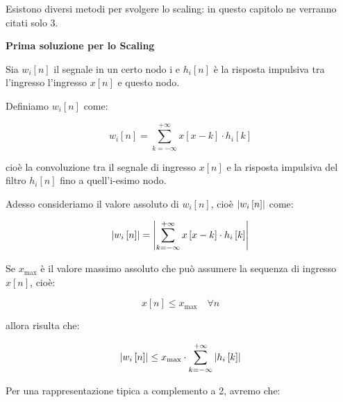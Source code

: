 Esistono diversi metodi per svolgere lo scaling: in questo capitolo ne verranno citati solo 3. \newline 

\textbf{Prima soluzione per lo Scaling} \newline 

Sia $w_{i} \left[ n\right]$ il segnale in un certo nodo i e $h_{i} \left[ n\right]$ è la risposta impulsiva tra l'ingresso l'ingresso $x \left[ n\right]$ e questo nodo. \newline 

Definiamo $w_{i} \left[ n\right]$ come: 

{
    \Large 
    \begin{equation}
        w_{i} \left[ n\right] 
        = 
        \sum_{k = -\infty}^{+ \infty} 
        x \left[ x - k\right]
        \cdot 
        h_{i} \left[ k\right]
    \end{equation}
}

cioè la convoluzione tra il segnale di ingresso $x \left[ n\right]$ e la risposta impulsiva del filtro $h_{i} \left[ n\right]$ fino a quell'i-esimo nodo. \newline 

Adesso consideriamo il valore assoluto di $w_{i} \left[ n\right]$, cioè $\abs{w_{i} \left[ n\right]}$ come: 

{
    \Large 
    \begin{equation}
        \abs{w_{i} \left[ n\right]}
        = 
        \abs{
            \sum_{k = -\infty}^{+ \infty} 
            x \left[ x - k\right]
            \cdot 
            h_{i} \left[ k\right]
        }
    \end{equation}
}

Se $x_{\text{max}}$ è il valore massimo assoluto che può assumere la sequenza di ingresso $x \left[ n\right]$, cioè: 

{
    \Large 
    \begin{equation}
        x \left[ n\right] \leq x_{\text{max}} \quad \forall n  
    \end{equation}
}

allora risulta che: 

{
    \Large 
    \begin{equation}
        \abs{w_{i} \left[ n\right]} 
        \leq 
        x_{\text{max}} 
        \cdot
        \sum_{k = -\infty}^{+ \infty} 
        \abs{h_{i} \left[ k\right]}    
    \end{equation}
}

Per una rappresentazione tipica a complemento a 2, avremo che: 

